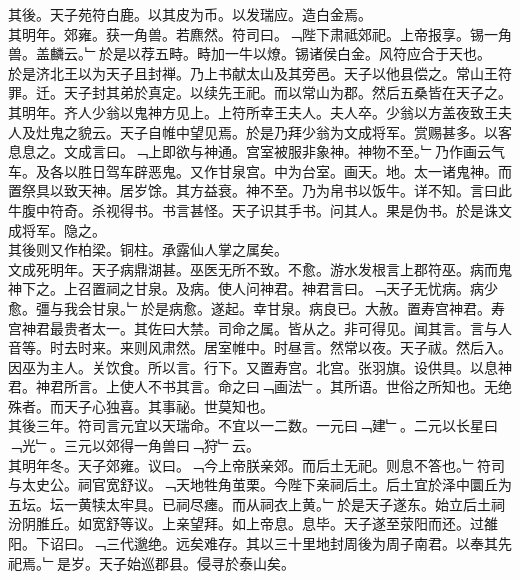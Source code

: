 \documentclass{zhvt-classic}
\begin{document}
\hspace*{2em}其後。天子苑符白鹿。以其皮为币。以发瑞应。造白金焉。\\
\hspace*{2em}其明年。郊雍。获一角兽。若麃然。符司曰。﹁陛下肃祗郊祀。上帝报享。锡一角兽。盖麟云。﹂於是以荐五畤。畤加一牛以燎。锡诸侯白金。风符应合于天也。\\
\hspace*{2em}於是济北王以为天子且封禅。乃上书献太山及其旁邑。天子以他县偿之。常山王符罪。迁。天子封其弟於真定。以续先王祀。而以常山为郡。然后五桑皆在天子之。\\
\hspace*{2em}其明年。齐人少翁以鬼神方见上。上符所幸王夫人。夫人卒。少翁以方盖夜致王夫人及灶鬼之貌云。天子自帷中望见焉。於是乃拜少翁为文成将军。赏赐甚多。以客息息之。文成言曰。﹁上即欲与神通。宫室被服非象神。神物不至。﹂乃作画云气车。及各以胜日驾车辟恶鬼。又作甘泉宫。中为台室。画天。地。太一诸鬼神。而置祭具以致天神。居岁馀。其方益衰。神不至。乃为帛书以饭牛。详不知。言曰此牛腹中符奇。杀视得书。书言甚怪。天子识其手书。问其人。果是伪书。於是诛文成将军。隐之。\\
\hspace*{2em}其後则又作柏梁。铜柱。承露仙人掌之属矣。\\
\hspace*{2em}文成死明年。天子病鼎湖甚。巫医无所不致。不愈。游水发根言上郡符巫。病而鬼神下之。上召置祠之甘泉。及病。使人问神君。神君言曰。﹁天子无忧病。病少愈。彊与我会甘泉。﹂於是病愈。遂起。幸甘泉。病良已。大赦。置寿宫神君。寿宫神君最贵者太一。其佐曰大禁。司命之属。皆从之。非可得见。闻其言。言与人音等。时去时来。来则风肃然。居室帷中。时昼言。然常以夜。天子祓。然后入。因巫为主人。关饮食。所以言。行下。又置寿宫。北宫。张羽旗。设供具。以息神君。神君所言。上使人不书其言。命之曰﹁画法﹂。其所语。世俗之所知也。无绝殊者。而天子心独喜。其事祕。世莫知也。\\
\hspace*{2em}其後三年。符司言元宜以天瑞命。不宜以一二数。一元曰﹁建﹂。二元以长星曰﹁光﹂。三元以郊得一角兽曰﹁狩﹂云。\\
\hspace*{2em}其明年冬。天子郊雍。议曰。﹁今上帝朕亲郊。而后土无祀。则息不答也。﹂符司与太史公。祠官宽舒议。﹁天地牲角茧栗。今陛下亲祠后土。后土宜於泽中圜丘为五坛。坛一黄犊太牢具。已祠尽瘗。而从祠衣上黄。﹂於是天子遂东。始立后土祠汾阴脽丘。如宽舒等议。上亲望拜。如上帝息。息毕。天子遂至荥阳而还。过雒阳。下诏曰。﹁三代邈绝。远矣难存。其以三十里地封周後为周子南君。以奉其先祀焉。﹂是岁。天子始巡郡县。侵寻於泰山矣。\\
\end{document}
